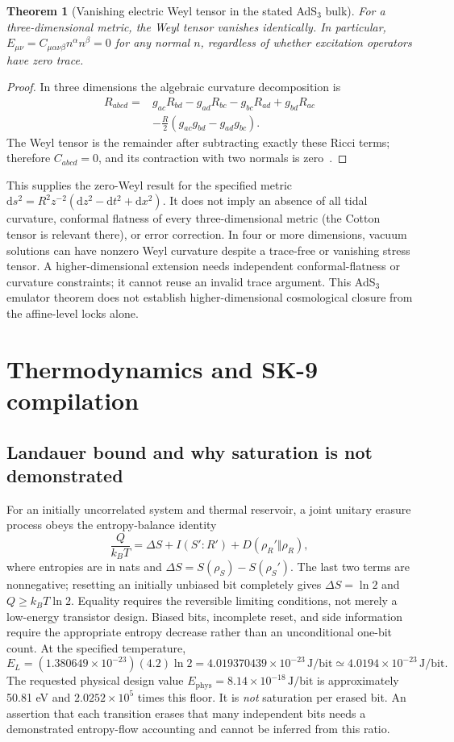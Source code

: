 \documentclass[11pt,a4paper]{article}
\newtheorem{theorem}{Theorem}[section]
\newcommand{\dd}{\mathrm d}
\newcommand{\unit}[1]{\,\mathrm{#1}}
\begin{document}
\begin{theorem}[Vanishing electric Weyl tensor in the stated AdS$_3$ bulk]
For a three-dimensional metric, the Weyl tensor vanishes identically. In particular,
$E_{\mu\nu}=C_{\mu\alpha\nu\beta}n^\alpha n^\beta=0$ for any normal $n$, regardless of
whether excitation operators have zero trace.
\end{theorem}
\begin{proof}
In three dimensions the algebraic curvature decomposition is
\begin{align*}
 R_{abcd}={}&g_{ac}R_{bd}-g_{ad}R_{bc}-g_{bc}R_{ad}+g_{bd}R_{ac}\\
 &-\frac{R}{2}(g_{ac}g_{bd}-g_{ad}g_{bc}).
\end{align*}
The Weyl tensor is the remainder after subtracting exactly these Ricci terms; therefore
$C_{abcd}=0$, and its contraction with two normals is zero~\cite{carroll}.
\end{proof}
This supplies the zero-Weyl result for the specified metric
$\dd s^2=R^2z^{-2}(\dd z^2-\dd t^2+\dd x^2)$. It does not imply an absence of all tidal
curvature, conformal flatness of every three-dimensional metric (the Cotton tensor is
relevant there), or error correction. In four or more dimensions, vacuum solutions can
have nonzero Weyl curvature despite a trace-free or vanishing stress tensor. A higher-dimensional
extension needs independent conformal-flatness or curvature constraints; it cannot reuse
an invalid trace argument. This AdS$_3$ emulator theorem does not establish
higher-dimensional cosmological closure from the affine-level locks alone.

\section{Thermodynamics and SK-9 compilation}
\label{sec:thermo}
\subsection{Landauer bound and why saturation is not demonstrated}
For an initially uncorrelated system and thermal reservoir, a joint unitary erasure process
obeys the entropy-balance identity~\cite{reeb}
\[
 \frac{Q}{k_BT}=\Delta S+I(S':R')+D(\rho_R'\Vert\rho_R),
\]
where entropies are in nats and $\Delta S=S(\rho_S)-S(\rho_S')$. The last two terms are
nonnegative; resetting an initially unbiased bit completely gives $\Delta S=\ln2$ and
$Q\ge k_BT\ln2$. Equality requires the reversible limiting conditions, not merely a
low-energy transistor design. Biased bits, incomplete reset, and side information require
the appropriate entropy decrease rather than an unconditional one-bit count.
At the specified temperature,
\[
 E_L=(1.380649\times10^{-23})(4.2)\ln2
 =4.019370439\times10^{-23}\unit{J/bit}
 \simeq4.0194\times10^{-23}\unit{J/bit}.
\]
The requested physical design value $E_{\mathrm{phys}}=8.14\times10^{-18}\unit{J/bit}$
is approximately 50.81 eV and $2.0252\times10^5$ times this floor. It is \emph{not}
saturation per erased bit. An assertion that each transition erases that many independent
bits needs a demonstrated entropy-flow accounting and cannot be inferred from this ratio.
\end{document}
